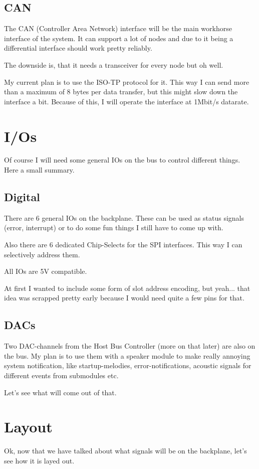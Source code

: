 \subsection{CAN}
The CAN (Controller Area Network) interface will be the main workhorse interface of the system. It can support a lot of nodes and due to it being a differential interface should work pretty reliably. 

The downside is, that it needs a transceiver for every node but oh well. 

My current plan is to use the ISO-TP protocol for it. This way I can send more than a maximum of 8 bytes per data transfer, but this might slow down the interface a bit. Because of this, I will operate the interface at 1Mbit/s datarate. 

\section{I/Os}
Of course I will need some general IOs on the bus to control different things. Here a small summary. 

\subsection{Digital}
There are 6 general IOs on the backplane. These can be used as status signals (error, interrupt) or to do some fun things I still have to come up with. 

Also there are 6 dedicated Chip-Selects for the SPI interfaces. This way I can selectively address them. 

All IOs are 5V compatible.

At first I wanted to include some form of slot address encoding, but yeah... that idea was scrapped pretty early because I would need quite a few pins for that. 

\subsection{DACs}
Two DAC-channels from the Host Bus Controller (more on that later) are also on the bus. My plan is to use them with a speaker module to make really annoying system notification, like startup-melodies, error-notifications, acoustic signals for different events from submodules etc. 

Let's see what will come out of that.

\section{Layout}
Ok, now that we have talked about what signals will be on the backplane, let's see how it is layed out. 

